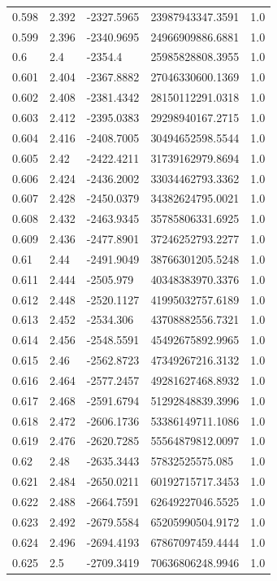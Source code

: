 \begin{tabular}{lllll}
0.598 & 2.392 & -2327.5965 & 23987943347.3591 & 1.0 \\
0.599 & 2.396 & -2340.9695 & 24966909886.6881 & 1.0 \\
0.6 & 2.4 & -2354.4 & 25985828808.3955 & 1.0 \\
0.601 & 2.404 & -2367.8882 & 27046330600.1369 & 1.0 \\
0.602 & 2.408 & -2381.4342 & 28150112291.0318 & 1.0 \\
0.603 & 2.412 & -2395.0383 & 29298940167.2715 & 1.0 \\
0.604 & 2.416 & -2408.7005 & 30494652598.5544 & 1.0 \\
0.605 & 2.42 & -2422.4211 & 31739162979.8694 & 1.0 \\
0.606 & 2.424 & -2436.2002 & 33034462793.3362 & 1.0 \\
0.607 & 2.428 & -2450.0379 & 34382624795.0021 & 1.0 \\
0.608 & 2.432 & -2463.9345 & 35785806331.6925 & 1.0 \\
0.609 & 2.436 & -2477.8901 & 37246252793.2277 & 1.0 \\
0.61 & 2.44 & -2491.9049 & 38766301205.5248 & 1.0 \\
0.611 & 2.444 & -2505.979 & 40348383970.3376 & 1.0 \\
0.612 & 2.448 & -2520.1127 & 41995032757.6189 & 1.0 \\
0.613 & 2.452 & -2534.306 & 43708882556.7321 & 1.0 \\
0.614 & 2.456 & -2548.5591 & 45492675892.9965 & 1.0 \\
0.615 & 2.46 & -2562.8723 & 47349267216.3132 & 1.0 \\
0.616 & 2.464 & -2577.2457 & 49281627468.8932 & 1.0 \\
0.617 & 2.468 & -2591.6794 & 51292848839.3996 & 1.0 \\
0.618 & 2.472 & -2606.1736 & 53386149711.1086 & 1.0 \\
0.619 & 2.476 & -2620.7285 & 55564879812.0097 & 1.0 \\
0.62 & 2.48 & -2635.3443 & 57832525575.085 & 1.0 \\
0.621 & 2.484 & -2650.0211 & 60192715717.3453 & 1.0 \\
0.622 & 2.488 & -2664.7591 & 62649227046.5525 & 1.0 \\
0.623 & 2.492 & -2679.5584 & 65205990504.9172 & 1.0 \\
0.624 & 2.496 & -2694.4193 & 67867097459.4444 & 1.0 \\
0.625 & 2.5 & -2709.3419 & 70636806248.9946 & 1.0 \\

\end{tabular}
